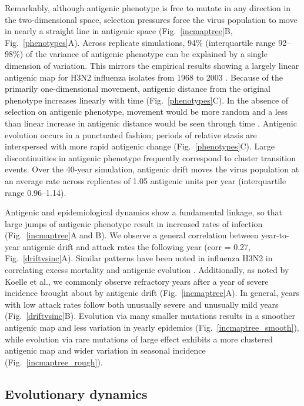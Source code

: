 \documentclass[11pt,oneside,letterpaper]{article}
\begin{document}
Remarkably, although antigenic phenotype is free to mutate in any direction in the two-dimensional space, selection pressures force the virus population to move in nearly a straight line in antigenic space (Fig.~\ref{incmaptree}B, Fig.~\ref{phenotypes}A).  Across replicate simulations, 94\% (interquartile range 92--98\%) of the variance of antigenic phenotype can be explained by a single dimension of variation.  This mirrors the empirical results showing a largely linear antigenic map for H3N2 influenza isolates from 1968 to 2003 \cite{Smith04}.  Because of the primarily one-dimensional movement, antigenic distance from the original phenotype increases linearly with time (Fig.~\ref{phenotypes}C).  In the absence of selection on antigenic phenotype, movement would be more random and a less than linear increase in antigenic distance would be seen through time \cite{Bedford09}.  Antigenic evolution occurs in a punctuated fashion; periods of relative stasis are interspersed with more rapid antigenic change (Fig.~\ref{phenotypes}C).  Large discontinuities in antigenic phenotype frequently correspond to cluster transition events.  Over the  40-year simulation, antigenic drift moves the virus population at an average rate across replicates of 1.05 antigenic units per year (interquartile range 0.96--1.14). 

Antigenic and epidemiological dynamics show a fundamental linkage, so that large jumps of antigenic phenotype result in increased rates of infection (Fig.~\ref{incmaptree}A and B).  We observe a general correlation between year-to-year antigenic drift and attack rates the following year (corr = 0.27, Fig.~\ref{driftvsinc}A).  Similar patterns have been noted in influenza H3N2 in correlating excess mortality and antigenic evolution \cite{Wu10}.  Additionally, as noted by Koelle et al.\cite{Koelle06}, we commonly observe refractory years after a year of severe incidence brought about by antigenic drift (Fig.~\ref{incmaptree}A).  In general, years with low attack rates follow both unusually severe and unusually mild years (Fig.~\ref{driftvsinc}B).  Evolution via many smaller mutations results in a smoother antigenic map and less variation in yearly epidemics (Fig.~\ref{incmaptree_smooth}), while evolution via rare mutations of large effect exhibits a more clustered antigenic map and wider variation in seasonal incidence (Fig.~\ref{incmaptree_rough}).

\subsection*{Evolutionary dynamics}
\end{document}
